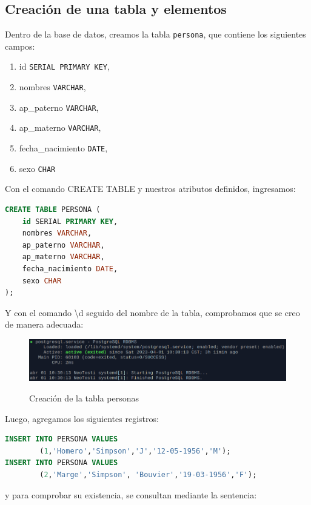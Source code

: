 \documentclass[a4paper,12pt]{article}
\begin{document}
\subsection{Creación de una tabla y elementos}

Dentro de la base de datos, creamos la tabla \texttt{persona}, que contiene los siguientes campos:\\

\begin{enumerate}
	\item id \texttt{SERIAL PRIMARY KEY},
	\item nombres \texttt{VARCHAR},
	\item ap\_paterno \texttt{VARCHAR},
	\item ap\_materno \texttt{VARCHAR},
	\item fecha\_nacimiento \texttt{DATE},
	\item sexo \texttt{CHAR}
\end{enumerate}

Con el comando CREATE TABLE y nuestros atributos definidos, ingresamos:\\

\begin{lstlisting}[language=sql]
CREATE TABLE PERSONA (
	id SERIAL PRIMARY KEY,
	nombres VARCHAR,
	ap_paterno VARCHAR,
	ap_materno VARCHAR,
	fecha_nacimiento DATE,
	sexo CHAR
);
\end{lstlisting}

Y con el comando \textbackslash d seguido del nombre de la tabla, comprobamos que se creo de manera adecuada:

\begin{figure}[!h]
\centering
	\includegraphics[width=.7\textwidth]{fig1}
	\label{fig5}
	 \caption{Creación de la tabla personas}
\end{figure}

Luego, agregamos los siguientes registros:\\

\begin{lstlisting}[language=sql]
INSERT INTO PERSONA VALUES
		(1,'Homero','Simpson','J','12-05-1956','M');
INSERT INTO PERSONA VALUES
		(2,'Marge','Simpson', 'Bouvier','19-03-1956','F');
\end{lstlisting}

y para comprobar su existencia, se consultan mediante la sentencia:
\end{document}
